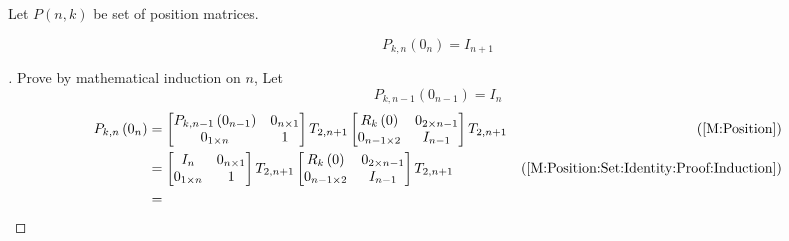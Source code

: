 \documentclass[stu, babel, american, biblatex, a4paper, leqno, draftall]{apa7}
\begin{document}
\begin{definition}\label{M:Position:Set}
    Let $P\left(n,k\right)$ be set of position matrices.
\end{definition}
\begin{corollary}\label{M:Position:Set:Identity}
    \begin{equation*}
        P_{k,n}
        \left(0_{n}\right)
        =
        I_{n+1}
    \end{equation*}
\end{corollary}
\begin{proof}[]
    Prove by mathematical induction on $n$,
    Let
    \begin{equation}\label{M:Position:Set:Identity:Proof:Induction}
        P_{k,n-1}\left(0_{n-1}\right)=I_n
    \end{equation}
    \begin{align*}
        P_{k, n}\left(0_{n}\right)
                   & =
        \begin{bmatrix}
            P_{k,n-1}\left(0_{n-1}\right) & 0_{n\times 1} \\
            0_{1\times n}                 & 1             \\
        \end{bmatrix}
        T_{2, n+1}
        \begin{bmatrix}
            R_{k}\left(0\right) & 0_{{2}\times{n-1}} \\
            0_{{n-1}\times{2}}  & {I}_{n-1}          \\
        \end{bmatrix}
        T_{2, n+1} & \text{(\cref{M:Position})}                              \\
                   & =
        \begin{bmatrix}
            I_{n}         & 0_{n\times 1} \\
            0_{1\times n} & 1             \\
        \end{bmatrix}
        T_{2, n+1}
        \begin{bmatrix}
            R_{k}\left(0\right) & 0_{{2}\times{n-1}} \\
            0_{{n-1}\times{2}}  & {I}_{n-1}          \\
        \end{bmatrix}
        T_{2, n+1} & \text{(\cref{M:Position:Set:Identity:Proof:Induction})} \\
                   & =

\end{align*}
\end{proof}
\end{document}
